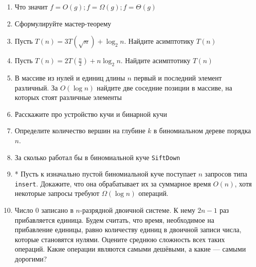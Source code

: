 \documentclass[a4paper, 12pt]{article}
\begin{document}
	\pagestyle{empty}
	\begin{enumerate}
		\item Что значит $f=O(g); f=\Omega(g);f=\Theta(g)$
		\item Сформулируйте мастер-теорему
		\item Пусть $T(n)=3T(\sqrt{n})  + \log_2n$. Найдите асимптотику $T(n)$
		\item Пусть $T(n)=2T(\frac{n}{2}) + n\log_2n$. Найдите асимптотику $T(n)$
		\item В массиве из нулей и единиц длины $n$ первый и последний элемент различный. За $O(\log n)$ найдите две соседние позиции в массиве, на которых стоят различные элементы
		\item Расскажите про устройство кучи и бинарной кучи
		\item Определите количество вершин на глубине $k$ в биномиальном дереве порядка $n$.
		\item За сколько работал бы в биномиальной куче \verb|SiftDown|
		\item* Пусть к изначально пустой биномиальной куче поступает $n$ запросов типа \verb|insert|. Докажите, что	она обрабатывает их за суммарное время $O(n)$, хотя некоторые запросы требуют $\Omega(\log n)$ операций.
		\item Число $0$ записано в $n$-разрядной двоичной системе. К нему $2n - 1$ раз прибавляется единица. Будем
		считать, что время, необходимое на прибавление единицы, равно количеству единиц в двоичной записи
		числа, которые становятся нулями. Оцените среднюю сложность всех таких операций. Какие операции
		являются самыми дешёвыми, а какие --- самыми дорогими?
	\end{enumerate}
\end{document}
